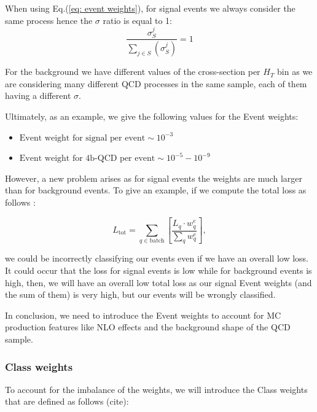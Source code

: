 When using Eq.(\ref{eq: event weights}),  for signal events we always consider the same process hence the $\sigma$ ratio is equal to 1:
\begin{equation*}
	\frac{\sigma_S^j}{\sum_{j\in S}(\sigma_S^j)}=1
\end{equation*}

For the background we have different values of the cross-section per $H_T$ bin as we are considering many different QCD processes in the same sample, each of them having a different $\sigma$.

\vspace{0.1 cm}

\noindent Ultimately, as an example, we give the following values for the Event weights:

\begin{itemize}
    \item $\text{Event weight for signal per event} \sim 10^{-3}$
    \item $\text{Event weight for 4b-QCD per event} \sim 10^{-5}-10^{-9}$
\end{itemize}

However, a new problem arises as for signal events the weights are much larger than for background events. To give an example, if we compute the total loss as follows :

\begin{equation}
    L_{\text{tot}}= \sum_{q \in \text{batch}} [\frac{L_q \cdot w^e_q}{\sum_q w^e_q} ] ,
\label{Eq: loss event weights}
\end{equation}

\noindent we could be incorrectly classifying our events even if we have an overall low loss. It could occur that the loss for signal events is low while for background events is high, then, we will have an overall low total loss as our signal Event weights (and the sum of them) is very high, but our events will be wrongly classified.

In conclusion, we need to introduce the Event weights to account for MC production features like NLO effects and the background shape of the QCD sample.

\subsubsection{Class weights}

To account for the imbalance of the weights, we will introduce the {Class weights} that are defined as follows (cite):

